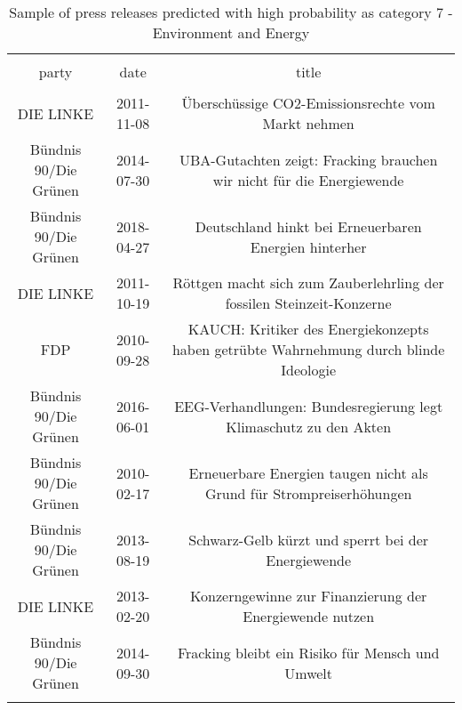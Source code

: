 
\begin{table}[!htbp] \centering 
  \caption{Sample of press releases predicted with high probability as category 7 - Environment and Energy} 
  \label{tab:7-document-samples} 
\begin{tabular}{@{\extracolsep{5pt}} ccc} 
\\[-1.8ex]\hline 
\hline \\[-1.8ex] 
party & date & title \\ 
\hline \\[-1.8ex] 
DIE LINKE & 2011-11-08 & Überschüssige CO2-Emissionsrechte vom Markt nehmen \\ 
Bündnis 90/Die Grünen & 2014-07-30 & UBA-Gutachten zeigt: Fracking brauchen wir nicht für die Energiewende \\ 
Bündnis 90/Die Grünen & 2018-04-27 & Deutschland hinkt bei Erneuerbaren Energien hinterher \\ 
DIE LINKE & 2011-10-19 & Röttgen macht sich zum Zauberlehrling der fossilen Steinzeit-Konzerne \\ 
FDP & 2010-09-28 & KAUCH: Kritiker des Energiekonzepts haben getrübte Wahrnehmung durch blinde Ideologie \\ 
Bündnis 90/Die Grünen & 2016-06-01 & EEG-Verhandlungen: Bundesregierung legt Klimaschutz zu den Akten \\ 
Bündnis 90/Die Grünen & 2010-02-17 & Erneuerbare Energien taugen nicht als Grund für Strompreiserhöhungen \\ 
Bündnis 90/Die Grünen & 2013-08-19 & Schwarz-Gelb kürzt und sperrt bei der Energiewende \\ 
DIE LINKE & 2013-02-20 & Konzerngewinne zur Finanzierung der Energiewende nutzen \\ 
Bündnis 90/Die Grünen & 2014-09-30 & Fracking bleibt ein Risiko für Mensch und Umwelt \\ 
\hline \\[-1.8ex] 
\end{tabular} 
\end{table} 
